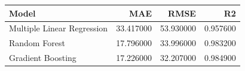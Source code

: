 \begin{tabular}{lrrr}
\toprule
Model & MAE & RMSE & R2 \\
\midrule
Multiple Linear Regression & 33.417000 & 53.930000 & 0.957600 \\
Random Forest & 17.796000 & 33.996000 & 0.983200 \\
Gradient Boosting & 17.226000 & 32.207000 & 0.984900 \\
\bottomrule
\end{tabular}
